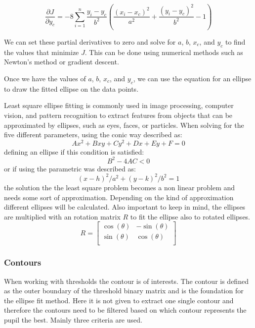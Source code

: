 \begin{equation}
    \frac{\partial J}{\partial y_c} = -8\sum_{i=1}^n \frac{y_i-y_c}{b^2}\left(\frac{(x_i-x_c)^2}{a^2} + \frac{(y_i-y_c)^2}{b^2} - 1\right)
\end{equation}


We can set these partial derivatives to zero and solve for $a$, $b$, $x_c$, and $y_c$ to find the values that minimize $J$. This can be done using numerical methods such as Newton's method or gradient descent.

Once we have the values of $a$, $b$, $x_c$, and $y_c$, we can use the equation for an ellipse to draw the fitted ellipse on the data points.

Least square ellipse fitting is commonly used in image processing, computer vision, and pattern recognition to extract features from objects that can be approximated by ellipses, such as eyes, faces, or particles. When solving for the five different parameters, using the conic way described as: 
\begin{equation}
    Ax^2+Bxy+Cy^2+Dx+Ey+F=0
\end{equation}
    defining an ellipse if this condition is satisfied:
\begin{equation}
    B^2-4AC < 0
\end{equation}
or if using the parametric was described as: 
\begin{equation}
    (x-h)^2/a^2 + (y-k)^2/b^2 = 1
\end{equation}
the solution the the least square problem becomes a non linear problem and needs some sort of approximation. Depending on the kind of approximation different ellipses will be calculated. Also important to keep in mind, the ellipses are multiplied with an rotation matrix $R$ to fit the ellipse also to rotated ellipses. 
\begin{equation}
    R = \begin{bmatrix}
        \cos(\theta) & -\sin(\theta) \\
        \sin(\theta) & \cos(\theta) \\
    \end{bmatrix}
\end{equation}
    
\subsubsection{Contours}
    When working with thresholds the contour is of interests. The contour is defined as the outer boundary of the threshold binary matrix and is the foundation for the ellipse fit method. 
    Here it is not given to extract one single contour and therefore the contours need to be filtered based on which contour represents the pupil the best. 
    Mainly three criteria are used. 
    
